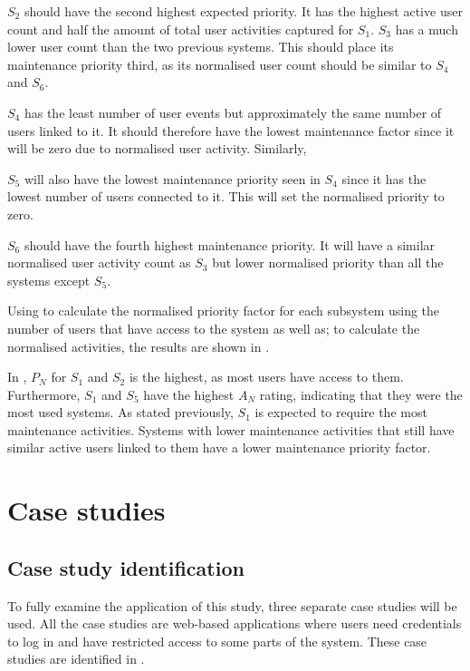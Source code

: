 $S_2$ should have the second highest expected priority. It has the highest active user count and half the amount of total user activities captured for $S_1$. $S_3$ has a much lower user count than the two previous systems. This should place its maintenance priority third, as its normalised user count should be similar to $S_4$ and $S_6$. \par $S_4$ has the least number of user events but approximately the same number of users linked to it. It should therefore have the lowest maintenance factor since it will be zero due to normalised user activity. Similarly, \par $S_5$ will also have the lowest maintenance priority seen in $S_4$ since it has the lowest number of users connected to it. This will set the normalised priority to zero. \par $S_6$ should have the fourth highest maintenance priority. It will have a similar normalised user activity count as $S_3$ but lower normalised priority than all the systems except $S_5$. \par Using  to calculate the normalised priority factor for each subsystem using the number of users that have access to the system as well as;  to calculate the normalised activities, the results are shown in .



In , $P_N$ for $S_1$ and $S_2$ is the highest, as most users have access to them. Furthermore, $S_1$ and $S_5$ have the highest $A_N$ rating, indicating that they were the most used systems. As stated previously, $S_1$ is expected to require the most maintenance activities. Systems with lower maintenance activities that still have similar active users linked to them have a lower maintenance priority factor.

\clearpage

\section{Case studies}\label{sec:ch3_caseStudies}

\subsection{Case study identification}
To fully examine the application of this study, three separate case studies will be used. All the case studies are web-based applications where users need credentials to log in and have restricted access to some parts of the system. These case studies are identified in .

